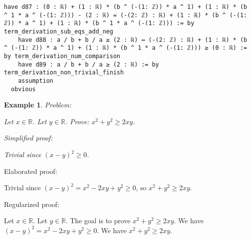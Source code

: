 \documentclass{article}
\newtheorem{example}{Example}
\begin{document}
\begin{tcolorbox}[colback=white!10, width=\linewidth]
\begin{lstlisting}[language=Lean4]
    have d87 : (0 : ℝ) + (1 : ℝ) * (b ^ (-(1: ℤ)) * a ^ 1) + (1 : ℝ) * (b ^ 1 * a ^ (-(1: ℤ))) - (2 : ℝ) = (-(2: ℤ) : ℝ) + (1 : ℝ) * (b ^ (-(1: ℤ)) * a ^ 1) + (1 : ℝ) * (b ^ 1 * a ^ (-(1: ℤ))) := by term_derivation_sub_eqs_add_neg
    have d88 : a / b + b / a ≥ (2 : ℝ) ↔ (-(2: ℤ) : ℝ) + (1 : ℝ) * (b ^ (-(1: ℤ)) * a ^ 1) + (1 : ℝ) * (b ^ 1 * a ^ (-(1: ℤ))) ≥ (0 : ℝ) := by term_derivation_num_comparison
    have d89 : a / b + b / a ≥ (2 : ℝ) := by term_derivation_non_trivial_finish
    assumption
  obvious

\end{lstlisting}
\end{tcolorbox}


\begin{example}
Problem:
\begin{tcolorbox}[colback=yellow!10, width=\linewidth]
Let $x\in\mathbb{R}$. Let $y\in\mathbb{R}$.
    Prove: $x^2 + y^2 \ge 2xy$.
\end{tcolorbox}

Simplified proof:
\begin{tcolorbox}[colback=blue!10, width=\linewidth]
Trivial since $(x-y)^2 \ge 0$.
\end{tcolorbox}
\end{example}

Elaborated proof:
\begin{tcolorbox}[colback=green!10, width=\linewidth]
Trivial since $(x-y)^2 = x^2 -2xy + y^2 \ge 0$, so $x^2 + y^2 \ge 2xy$.
\end{tcolorbox}

Regularized proof:
\begin{tcolorbox}[colback=red!10, width=\linewidth]
Let $x\in\mathbb{R}$.
Let $y\in\mathbb{R}$.
The goal is to prove $x^2 + y^2 \ge 2xy$.
We have ${{(x-y)}}^2 = x^2 -2xy + y^2 \ge 0$.
We have $x^2 + y^2 \ge 2xy$.
\end{tcolorbox}
\end{document}
